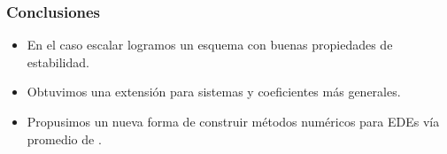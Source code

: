 \begin{frame}
    \frametitle{Conclusiones}
		\begin{itemize}
			\item<+->
				En el caso escalar logramos un esquema con buenas propiedades de estabilidad.
			\item<+-> 
				Obtuvimos una extensión para sistemas y coeficientes más generales.
			\item<+>[]
				\begin{alertblock}{Propusimos un nueva forma de construir métodos numéricos para EDEs}
					v\'ia promedio de .
				\end{alertblock}
		\end{itemize}
\end{frame}
